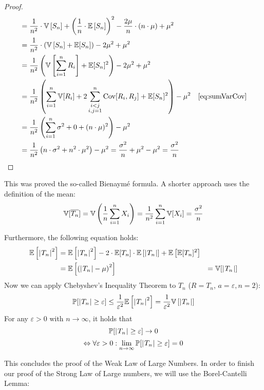 \begin{proof}
\begin{align}
              &= \frac1{n^2} \cdot \mathbb V\left[S_n\right] + \left(\frac1{n} \cdot \mathbb E\left[S_n\right]\right)^2 - \frac{2\mu}{n} \cdot (n \cdot \mu) + \mu^2 \nonumber \\
              &= \frac1{n^2} \cdot \left(\mathbb V\left[S_n\right] + \mathbb E[S_n]\right) - 2\mu^2 + \mu^2 \nonumber \\
              &= \frac{1}{n^2} \left(\mathbb V\left[\sum_{i=1}^n R_i\right] + \mathbb E[S_n]^2\right) - 2\mu^2 + \mu^2 \nonumber\\
              &= \frac{1}{n^2} \left(\sum_{i=1}^n \mathbb V[R_i] + 2\sum_{\substack{i<j \\ i,j=1}}^n \operatorname{Cov}[R_i,R_j] + \mathbb E[S_n]^2\right) - \mu^2 & \eqref{eq:sumVarCov} \nonumber\\
              &= \frac{1}{n^2} \left(\sum_{i=1}^n \sigma^2 + 0 + (n \cdot \mu)^2\right) - \mu^2 \nonumber\\
              &= \frac{1}{n^2} \left(n \cdot \sigma^2 + n^2 \cdot \mu^2\right) - \mu^2 = \frac{\sigma^2}{n} + \mu^2 - \mu^2 = \frac{\sigma^2}{n}
  \end{align}
\end{proof}
This was proved the so-called Bienaym\'e formula.
A shorter approach uses the definition of the mean:
\[ \mathbb V[\overline{T_n}] = \mathbb V\left(\frac1n \sum_{i=1}^n X_i\right) = \frac1{n^2} \sum_{i=1}^n \mathbb V[X_i] = \frac{\sigma^2}{n} \]

Furthermore, the following equation holds:
\begin{align}
    \mathbb E\left[\left|\hspace{0.6999pt}T_n\hspace{0.6999pt}\right|^2\right]
        &= \mathbb E\left[\left|\hspace{0.6999pt}T_n\hspace{0.6999pt}\right|^2\right] - 2 \cdot \mathbb E[T_n] \cdot \mathbb E\left[\left|\hspace{0.6999pt}T_n\hspace{0.6999pt}\right|\right] + \mathbb E\left[\mathbb E[T_n]^2\right] \nonumber\\
        &= \mathbb E\left[\left(\left|\hspace{0.6999pt}T_n\hspace{0.6999pt}\right| - \mu\right)^2\right] \nonumber
        &= \mathbb V[\left|\hspace{0.6999pt}T_n\hspace{0.6999pt}\right|] \nonumber
\end{align}
%
Now we can apply Chebyshev's Inequality Theorem to $T_n$ ($R = T_n$, $a = \varepsilon, n=2$):
\[
  \mathbb P[\left|\hspace{0.6999pt}T_n\hspace{0.6999pt}\right| \geq \varepsilon]
    \leq \frac{1}{\varepsilon^2} \mathbb E\left[\left|\hspace{0.6999pt}T_n\hspace{0.6999pt}\right|^2\right]
    = \frac{1}{\varepsilon^2} \mathbb V\left[\left|\hspace{0.6999pt}T_n\hspace{0.6999pt}\right|\right]
\]
For any $\varepsilon > 0$ with $n \to \infty$, it holds that
\[ \mathbb P[\left|\hspace{0.6999pt}T_n\hspace{0.6999pt}\right| \geq \varepsilon] \to 0 \]
\[
    \Leftrightarrow \forall \varepsilon > 0:
    \lim_{n\to\infty} \mathbb P[\left|\hspace{0.6999pt}T_n\hspace{0.6999pt}\right| \geq \varepsilon] = 0
\]

This concludes the proof of the Weak Law of Large Numbers.
In order to finish our proof of the Strong Law of Large numbers,
we will use the Borel-Cantelli Lemma:


